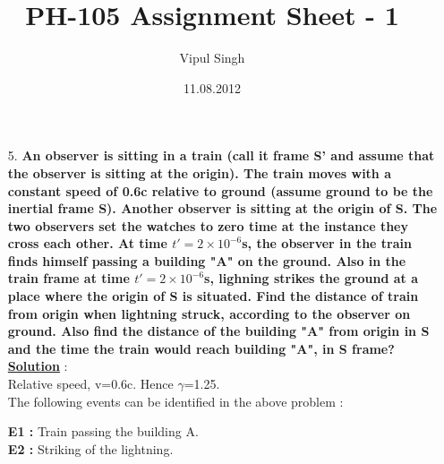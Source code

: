 \documentclass[10pt, a4paper]{article}
\begin{document}
\title{PH-105 Assignment Sheet - 1}
\date{11.08.2012}
\author{Vipul Singh}
\maketitle
\begin{enumerate}
\item[5.]{\bf An observer is sitting in a train (call it frame S' and assume that the observer is sitting at the origin). The train moves with a constant speed of 0.6c relative to ground (assume ground to be the inertial frame S). Another observer is sitting at the origin of S. The two observers set the watches to zero time at the instance they cross each other. At time $t'=2\times10^{-6}$s, the observer in the train finds himself passing a building "A" on the ground. Also in the train frame at time $t'=2\times10^{-6}$s, lighning strikes the ground at a place where the origin of S is situated. Find the distance of train from origin when lightning struck, according to the observer on ground. Also find the distance of the building "A" from origin in S and the time the train would reach building "A", in S frame?}\\

{\underline {\bf Solution}} : \\
Relative speed, v=0.6c. Hence $\gamma$=1.25. \\
The following events can be identified in the above problem :
	
{\bf E1 :} Train passing the building A.\\
{\bf E2 :} Striking of the lightning.
	

\end{enumerate}
\end{document}
